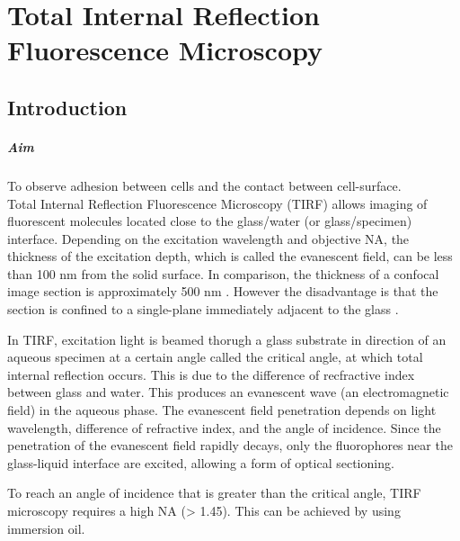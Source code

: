 
\chapter{Total Internal Reflection Fluorescence Microscopy}
\label{chp:TIRF}

\section{Introduction}

\paragraph{Aim} To observe adhesion between cells and the contact between cell-surface.
\\

Total Internal Reflection Fluorescence Microscopy (TIRF) allows imaging of fluorescent molecules located close to the glass/water (or glass/specimen) interface. 
Depending on the excitation wavelength and objective NA, the thickness of the excitation depth, which is called the evanescent field, can be less than 100 nm from the solid surface. 
In comparison, the thickness of a confocal image section is approximately 500 nm \cite{Fish2009}. 
However the disadvantage is that the section is confined to a single-plane immediately adjacent to the glass \cite{Sanderson2014}.

In TIRF, excitation light is beamed thorugh a glass substrate in direction of an aqueous specimen at a certain angle called the critical angle, at which total internal reflection occurs. 
This is due to the difference of recfractive index between glass and water. This produces an evanescent wave (an electromagnetic field) in the aqueous phase. 
The evanescent field penetration depends on light wavelength, difference of refractive index, and the angle of incidence. 
Since the penetration of the evanescent field rapidly decays, only the fluorophores near the glass-liquid interface are excited, allowing a form of optical sectioning. 

To reach an angle of incidence that is greater than the critical angle, TIRF microscopy requires a high NA (> 1.45). This can be achieved by using immersion oil.

